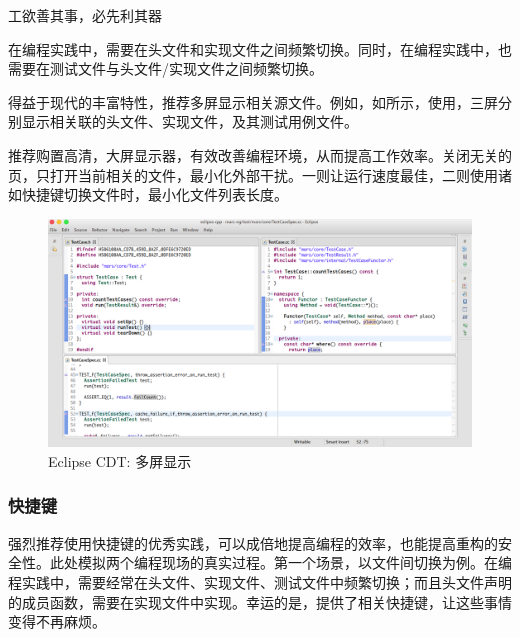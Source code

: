 \begin{content}
\begin{episode}{工欲善其事，必先利其器}
\begin{content}
在\cpp{}编程实践中，需要在头文件和实现文件之间频繁切换。同时，在编程实践中，也需要在测试文件与头文件/实现文件之间频繁切换。

得益于现代的丰富特性，推荐多屏显示相关源文件。例如，如所示，使用，三屏分别显示相关联的头文件、实现文件，及其测试用例文件。

推荐购置高清，大屏显示器，有效改善编程环境，从而提高工作效率。关闭无关的页，只打开当前相关的文件，最小化外部干扰。一则让运行速度最佳，二则使用诸如快捷键切换文件时，最小化文件列表长度。

\begin{figure}[H]
\centering
\includegraphics[width=1.0\textwidth]{figures/xunit/eclipse-multi-editor.png}
\caption{Eclipse CDT: 多屏显示}
 \label{fig:eclipse-multi-editor}
\end{figure}

\subsubsection{快捷键}

强烈推荐使用快捷键的优秀实践，可以成倍地提高编程的效率，也能提高重构的安全性。此处模拟两个编程现场的真实过程。第一个场景，以文件间切换为例。在编程实践中，需要经常在头文件、实现文件、测试文件中频繁切换；而且头文件声明的成员函数，需要在实现文件中实现。幸运的是，提供了相关快捷键，让这些事情变得不再麻烦。

\begin{enum}
\end{enum}


\end{content}
\end{episode}
\end{content}
